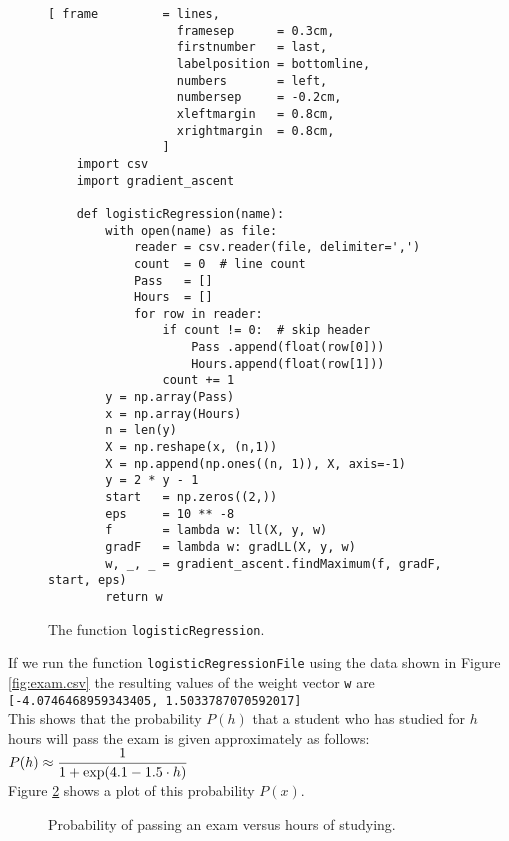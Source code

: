 \begin{figure}[!ht]
\centering
\begin{Verbatim}[ frame         = lines, 
                  framesep      = 0.3cm, 
                  firstnumber   = last,
                  labelposition = bottomline,
                  numbers       = left,
                  numbersep     = -0.2cm,
                  xleftmargin   = 0.8cm,
                  xrightmargin  = 0.8cm,
                ]
    import csv
    import gradient_ascent

    def logisticRegression(name):
        with open(name) as file:
            reader = csv.reader(file, delimiter=',')
            count  = 0  # line count
            Pass   = []
            Hours  = []
            for row in reader:
                if count != 0:  # skip header
                    Pass .append(float(row[0]))
                    Hours.append(float(row[1]))
                count += 1
        y = np.array(Pass)
        x = np.array(Hours)
        n = len(y)
        X = np.reshape(x, (n,1))
        X = np.append(np.ones((n, 1)), X, axis=-1)
        y = 2 * y - 1
        start   = np.zeros((2,))
        eps     = 10 ** -8
        f       = lambda w: ll(X, y, w)
        gradF   = lambda w: gradLL(X, y, w)
        w, _, _ = gradient_ascent.findMaximum(f, gradF, start, eps)
        return w
\end{Verbatim}
\vspace*{-0.3cm}
\caption{The function \texttt{logisticRegression}.}
\label{fig:logistic_regression.py:2}
\end{figure}

If we run the function \texttt{logisticRegressionFile} using the data shown in Figure
\ref{fig:exam.csv} the resulting values of the weight vector \texttt{w} are
\\[0.2cm]
\hspace*{1.3cm}
\texttt{[-4.0746468959343405, 1.5033787070592017]}
\\[0.2cm]
This shows that the probability $P(h)$ that a student who has studied for $h$ hours will pass the
exam is given approximately as follows:
\\[0.2cm]
\hspace*{1.3cm}
$\displaystyle P(h) \approx \frac{1}{1 + \exp(4.1 - 1.5 \cdot h)}$
\\[0.2cm]
Figure \ref{fig:exam-probability.pdf} shows a plot of this probability $P(x)$.  

\begin{figure}[!th]
\caption{Probability of passing an exam versus hours of studying.}
\label{fig:exam-probability.pdf}
\end{figure}


